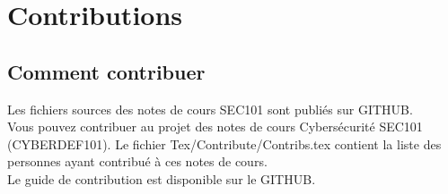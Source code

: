 
\section{Contributions}

\subsection{Comment contribuer}

Les fichiers sources des notes de cours  SEC101 sont publiés sur GITHUB. \\
Vous pouvez contribuer au projet des notes de cours Cybersécurité SEC101 (CYBERDEF101). Le fichier Tex/Contribute/Contribs.tex contient la liste des personnes ayant contribué à ces notes de cours.
\\ Le guide de contribution est disponible sur le GITHUB.

